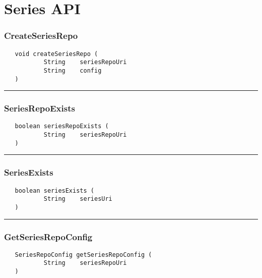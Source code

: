 \chapter{Series API}

\subsection{CreateSeriesRepo}
\label{Api:CreateSeriesRepo}
\begin{verbatim}
   void createSeriesRepo (
           String    seriesRepoUri
           String    config
   )
\end{verbatim}



\rule{15cm}{2pt}
\subsection{SeriesRepoExists}
\label{Api:SeriesRepoExists}
\begin{verbatim}
   boolean seriesRepoExists (
           String    seriesRepoUri
   )
\end{verbatim}



\rule{15cm}{2pt}
\subsection{SeriesExists}
\label{Api:SeriesExists}
\begin{verbatim}
   boolean seriesExists (
           String    seriesUri
   )
\end{verbatim}



\rule{15cm}{2pt}
\subsection{GetSeriesRepoConfig}
\label{Api:GetSeriesRepoConfig}
\begin{verbatim}
   SeriesRepoConfig getSeriesRepoConfig (
           String    seriesRepoUri
   )
\end{verbatim}



